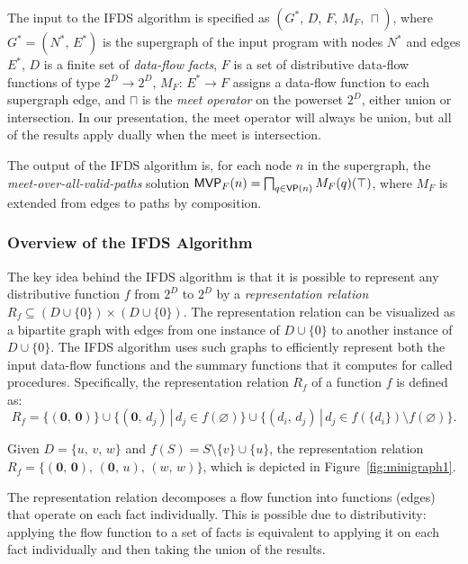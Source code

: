 The input to the IFDS algorithm is specified as
  $(G^*,\,D,\,F,\,M_F,\,\sqcap)$,
where $G^*=(N^*,\,E^*)$ is the supergraph of the input program with nodes $N^*$ and edges $E^*$,
$D$ is a finite set of \textit{data-flow facts},
$F$ is a set of distributive data-flow functions of type $2^D\to2^D$,
$M_F:\,E^*\to F$ assigns a data-flow function to each supergraph edge,
and $\sqcap$ is the \textit{meet operator} on the powerset $2^D$, either union or intersection.
In our presentation, the meet operator will always be union, but all of the results apply dually when the
meet is intersection.

The output of the IFDS algorithm is, for each node $n$ in the supergraph, the \textit{meet-over-all-valid-paths} solution
 $\textsf{MVP}_{F}(n)=\bigsqcap_{q\in\textsf{VP}(n)}M_F(q)(\top)$, where $M_F$ is extended from edges to paths by composition.

\subsubsection{Overview of the IFDS Algorithm}\label{sec:overviewifds}
The key idea behind the IFDS algorithm is that it is possible to represent any distributive
function $f$ from $2^D$ to $2^D$ by a \textit{representation relation} $R_f \subseteq 
(D \cup \{0\})
\times
(D \cup \{0\})$. The representation relation can be visualized as a bipartite graph
with edges from one instance of $D \cup \{0\}$ to another instance of $D \cup \{0\}$.
The IFDS algorithm uses such graphs to efficiently represent both the input data-flow functions
and the summary functions that it computes for called procedures.
Specifically, the representation relation $R_f$ of a function $f$ is defined as:
\[
R_f=\{(\mathbf0,\,\mathbf0)\}\cup
      \{(\mathbf0,\,d_j)\,|\,d_j\in f(\varnothing)\}\cup
      \{(d_i,\,d_j)\,|\,d_j\in f(\{d_i\}) \setminus f(\varnothing)\}.
\]
\vspace{-5mm}
\begin{example}\label{ex:flowfun}
Given $D=\{u,\,v,\,w\}$ and $f(S) = S\setminus\{v\} \cup \{u\}$,
    the representation
 relation 
  $
    R_f=\{(\mathbf0,\,\mathbf0),\,(\mathbf0,\,u),\,(w,\,w)\}
$, which is depicted in Figure~\ref{fig:minigraph1}.
\end{example}

The representation relation decomposes a flow function into functions
(edges) that operate on each fact individually. This is possible due
to distributivity: applying the flow function to a set of facts is
equivalent to applying it on each fact individually and then
taking the union of the results.

